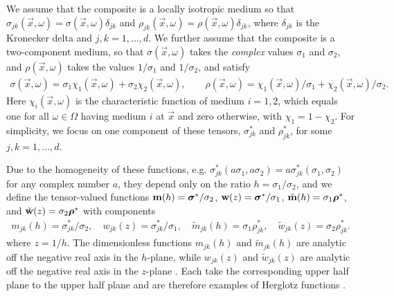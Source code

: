 \documentclass{cmslatex}
\newcommand\bsig{\mbox{\boldmath${\sigma}$}}
\newcommand\brho{\mbox{\boldmath${\rho}$}}
\begin{document}
We assume that the composite is a locally isotropic medium so that 
$\sigma_{jk}(\vec{x},\omega)=\sigma(\vec{x},\omega)\delta_{jk}$ and
$\rho_{jk}(\vec{x},\omega)=\rho(\vec{x},\omega)\delta_{jk}$, where $\delta_{jk}$ is the
Kronecker delta and $j,k=1,\ldots,d$. We further assume that the composite
is a two-component medium, so that $\sigma(\vec{x},\omega)$ takes the
\emph{complex} values $\sigma_1$ and $\sigma_2$, and $\rho(\vec{x},\omega)$ takes the
values $1/\sigma_1$ and $1/\sigma_2$, and satisfy \cite{Golden:CMP-473}
% 
\begin{align}\label{eq:two-phase_eps}
  \sigma(\vec{x},\omega)=\sigma_1\chi_1(\vec{x},\omega)+\sigma_2\chi_2(\vec{x},\omega), \qquad
  \rho(\vec{x},\omega)=\chi_1(\vec{x},\omega)/\sigma_1+\chi_2(\vec{x},\omega)/\sigma_2.
\end{align}
%
Here $\chi_i(\vec{x},\omega)$ is the characteristic function of medium
$i=1,2$, which equals one for all $\omega\in\Omega$ having medium $i$ at $\vec{x}$
and zero otherwise, with $\chi_1=1-\chi_2$. For simplicity, we focus on one
component of these tensors, $\sigma^*_{jk}$ and $\rho^*_{jk}$, for some
$j,k=1,\ldots,d$.  



Due to the homogeneity of these functions,
e.g. $\sigma_{jk}^*(a\sigma_1,a\sigma_2)=a\sigma_{jk}^*(\sigma_1,\sigma_2)$ for any complex number
$a$, they depend only on the ratio $h=\sigma_1/\sigma_2$, and we define the
tensor-valued functions $\mathbf{m}(h)=\bsig^*/\sigma_2$,
$\mathbf{w}(z)=\bsig^*/\sigma_1$, $\tilde{\mathbf{m}}(h)=\sigma_1\brho^*$, and
$\tilde{\mathbf{w}}(z)=\sigma_2\brho^*$ with components  
%
\begin{align}\label{eq:m_h}
  m_{jk}(h)=\sigma_{jk}^*/\sigma_2, \quad
  w_{jk}(z)=\sigma_{jk}^*/\sigma_1, \quad
   \tilde{m}_{jk}(h)=\sigma_1\rho_{jk}^*, \quad
   \tilde{w}_{jk}(z)=\sigma_2\rho_{jk}^*.
\end{align}
%
where $z=1/h$. The dimensionless functions $m_{jk}(h)$ and
$\tilde{m}_{jk}(h)$ are analytic off the negative real axis in the
$h$-plane, while $w_{jk}(z)$ and $\tilde{w}_{jk}(z)$ are analytic off
the negative real axis in the $z$-plane \cite{Golden:CMP-473}. Each
take the corresponding upper half plane to the upper half plane and
are therefore examples of Herglotz functions
\cite{Deift:2000:RMT,Golden:CMP-473}.
\end{document}
